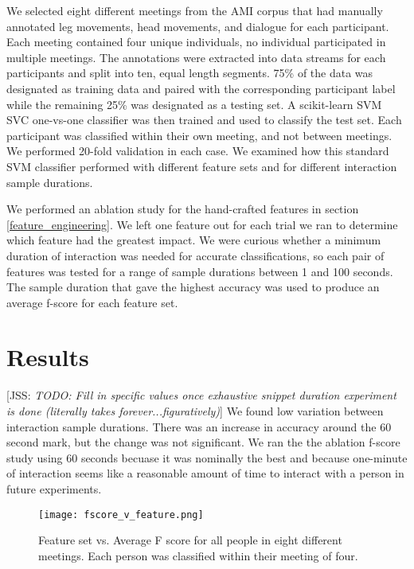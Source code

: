 \documentclass[conference]{IEEEtran}
\newcommand{\meta}[1]{{\textcolor[rgb]{0.1,0.7,0.2}{[JSS: {\it #1}]}}}
\begin{document}
We selected eight different meetings from the AMI corpus that had manually annotated leg movements, head movements, and dialogue for each participant. Each meeting contained four unique individuals, no individual participated in multiple meetings. The annotations were extracted into data streams for each participants and split into ten, equal length segments. 75\% of the data was designated as training data and paired with the corresponding participant label while the remaining 25\% was designated as a testing set. A scikit-learn SVM SVC one-vs-one classifier was then trained and used to classify the test set. Each participant was classified within their own meeting, and not between meetings. We performed 20-fold validation in each case. We examined how this standard SVM classifier performed with different feature sets and for different interaction sample durations. 

We performed an ablation study for the hand-crafted features in section \ref{feature_engineering}. We left one feature out for each trial we ran to determine which feature had the greatest impact. We were curious whether a minimum duration of interaction was needed for accurate classifications, so each pair of features was tested for a range of sample durations between 1 and 100 seconds. The sample duration that gave the highest accuracy was used to produce an average f-score for each feature set. 

\section{Results}

\meta{TODO: Fill in specific values once exhaustive snippet duration experiment is done (literally takes forever...figuratively)} We found low variation between interaction sample durations. There was an increase in accuracy around the 60 second mark, but the change was not significant. We ran the the ablation f-score study using 60 seconds becuase it was nominally the best and because one-minute of interaction seems like a reasonable amount of time to interact with a person in future experiments. 

\begin{figure}[h]
    \caption{Feature set vs. Average F score for all people in eight different meetings. Each person was classified within their meeting of four.}
    \centering
    \texttt{[image: fscore\_v\_feature.png]}
    \label{fscore}
\end{figure}
\end{document}
